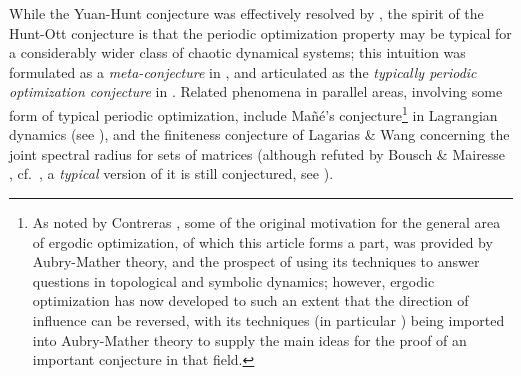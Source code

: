 \documentclass[reqno,11pt]{amsart}
\theoremstyle{definition}
\theoremstyle{remark}
\theoremstyle{remark}
\numberwithin{equation}{section}
\begin{document}
While the Yuan-Hunt conjecture was effectively resolved by \cite{C02, HLMXZ19}, the spirit of the Hunt-Ott conjecture
is that the periodic optimization property may be typical 
for a considerably wider
class of chaotic dynamical systems;
this intuition was formulated as a \emph{meta-conjecture} in \cite{bochi_slides}, and articulated as the 
\emph{typically periodic optimization conjecture} in \cite{Jen19}.
Related phenomena in parallel areas, involving some form of typical periodic optimization, include Ma\~n\'e's 
conjecture\footnote{As noted by Contreras \cite[p.~4]{contreras24}, some of the original motivation for the general area of ergodic optimization, of which this article forms a part, was provided by Aubry-Mather theory,
and the prospect of using its techniques to answer questions in topological and symbolic dynamics; however, ergodic optimization has now developed to such an extent that the direction of influence can be reversed,
with its techniques (in particular \cite{bressaudquas, HLMXZ19})
being imported into Aubry-Mather theory to supply
the main ideas for the proof of an important conjecture in that field.}
in Lagrangian dynamics
(see \cite{contreras24,Ma92,Ma96}), and the finiteness conjecture of Lagarias \& Wang \cite{lagariaswang} 
concerning the joint spectral radius for sets of matrices
(although refuted by Bousch \& Mairesse \cite{bouschmairesse}, cf.~\cite{jenkinsonpollicott, morrissidorov},
a \emph{typical} version of it is still conjectured, see \cite{maesumi}).
\end{document}
